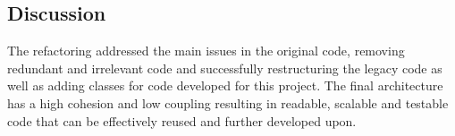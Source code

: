 \subsection{Discussion}
The refactoring addressed the main issues in the original code, removing redundant and irrelevant code and successfully restructuring the legacy code as well as adding classes for code developed for this project. The final architecture has a high cohesion and low coupling resulting in readable, scalable and testable code that can be effectively reused and further developed upon.




